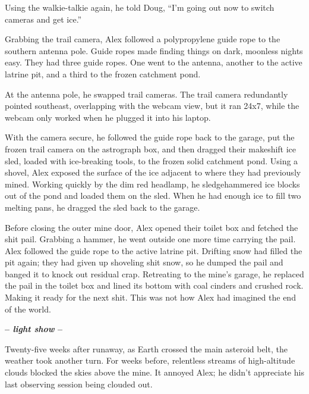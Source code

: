 Using the walkie-talkie again, he told Doug, ``I'm going out now to
switch cameras and get ice.''

Grabbing the trail camera, Alex followed a polypropylene guide rope to
the southern antenna pole. Guide ropes made finding things on dark,
moonless nights easy. They had three guide ropes. One went to the
antenna, another to the active latrine pit, and a third to the frozen
catchment pond.

At the antenna pole, he swapped trail cameras. The trail camera
redundantly pointed southeast, overlapping with the webcam view, but it
ran 24x7, while the webcam only worked when he plugged it into his
laptop.

With the camera secure, he followed the guide rope back to the garage,
put the frozen trail camera on the astrograph box, and then dragged
their makeshift ice sled, loaded with ice-breaking tools, to the frozen
solid catchment pond. Using a shovel, Alex exposed the surface of the
ice adjacent to where they had previously mined. Working quickly by the
dim red headlamp, he sledgehammered ice blocks out of the pond and
loaded them on the sled. When he had enough ice to fill two melting
pans, he dragged the sled back to the garage.

Before closing the outer mine door, Alex opened their toilet box and
fetched the shit pail. Grabbing a hammer, he went outside one more time
carrying the pail. Alex followed the guide rope to the active latrine
pit. Drifting snow had filled the pit again; they had given up shoveling
shit snow, so he dumped the pail and banged it to knock out residual
crap. Retreating to the mine's garage, he replaced the pail in the
toilet box and lined its bottom with coal cinders and crushed rock.
Making it ready for the next shit. This was not how Alex had imagined
the end of the world.

\begin{center}\large\textbf{-- \emph{light show} --}\normalsize\end{center}

Twenty-five weeks after runaway, as Earth crossed the main asteroid
belt, the weather took another turn. For weeks before, relentless
streams of high-altitude clouds blocked the skies above the mine. It
annoyed Alex; he didn't appreciate his last observing session being
clouded out.


